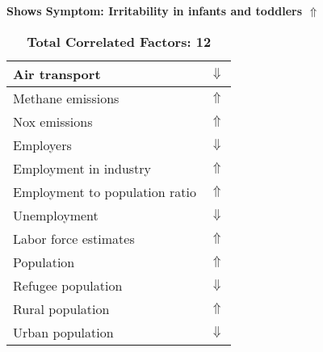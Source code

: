 \documentclass[12pt,notitlepage,oneside]{report}
\begin{document}
\begin{table}[!htb]
\caption{\textbf{Shows Symptom: Irritability in infants and toddlers $\Uparrow$}}
\centering
\label{Correlated Socio-economic Factors0}
\begin{tabular}{|l|l|}
\hline
Air transport  & $\Downarrow$\\ \hline
Methane emissions & $\Uparrow$\\ \hline
Nox emissions & $\Uparrow$\\ \hline
Employers & $\Downarrow$\\ \hline
Employment in industry & $\Uparrow$\\ \hline
Employment to population ratio & $\Uparrow$\\ \hline
Unemployment & $\Downarrow$\\ \hline
Labor force estimates & $\Uparrow$\\ \hline
Population & $\Uparrow$\\ \hline
Refugee population & $\Downarrow$\\ \hline
Rural population & $\Uparrow$\\ \hline
Urban population & $\Downarrow$\\ \hline
\end{tabular}
\caption*{\textbf{Total Correlated Factors: 12}}
\end{table}
\end{document}
